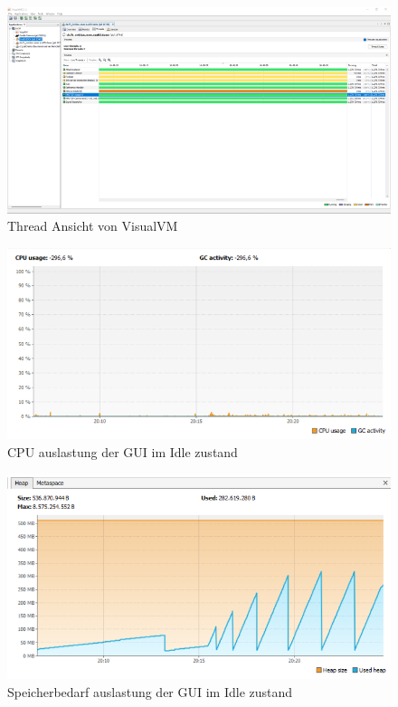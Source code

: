 \documentclass[a4paper,12pt]{scrreprt}
\begin{document}
\begin{figure}
  \centering
  \includegraphics{VisualVM_Threads.png}
  \caption{Thread Ansicht von VisualVM}
  \label{fig:VisualVM_Threads}
\end{figure}

\begin{figure}
  \centering
  \includegraphics{GUI_CPU_idle.png}
  \caption{CPU auslastung der GUI im Idle zustand}
  \label{fig:GUI_CPU_idle}
\end{figure}

\begin{figure}
  \centering
  \includegraphics{GUI_Idle.png}
  \caption{Speicherbedarf auslastung der GUI im Idle zustand}
  \label{fig:GUI_MEM_idle}
\end{figure}
\end{document}
